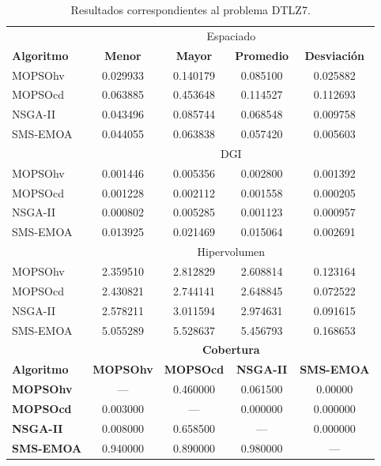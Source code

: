  \begin{table}
 \begin{center}
 \begin{tabular}{|l|cc|cc|} \hline
    & \multicolumn{4}{|c|}{Espaciado} \\ 
	\textbf{Algoritmo} & \textbf{Menor} & \textbf{Mayor} & \textbf{Promedio} & \textbf{Desviaci\'on} \\  \hline \hline
	MOPSOhv &0.029933 & 0.140179 & 0.085100 & 0.025882    \\ 
	MOPSOcd & 0.063885 & 0.453648 & 0.114527 & 0.112693   \\ 
	NSGA-II &0.043496 & 0.085744 & 0.068548 & 0.009758  \\  
	SMS-EMOA &0.044055 & 0.063838 & 0.057420 & 0.005603    \\  
	\hline
    & \multicolumn{4}{|c|}{DGI} \\ 
	\hline\hline
	MOPSOhv &0.001446 & 0.005356 & 0.002800 & 0.001392   \\ 
	MOPSOcd & 0.001228 & 0.002112 & 0.001558 & 0.000205   \\ 
	NSGA-II & 0.000802 & 0.005285 & 0.001123 & 0.000957  \\  
	SMS-EMOA &0.013925 & 0.021469 & 0.015064 & 0.002691  \\  
	\hline\hline
    & \multicolumn{4}{|c|}{Hipervolumen} \\ 
	\hline\hline
	MOPSOhv & 2.359510 & 2.812829 & 2.608814 & 0.123164  \\ 
	MOPSOcd & 2.430821 & 2.744141 & 2.648845 & 0.072522   \\ 
	NSGA-II & 2.578211 & 3.011594 & 2.974631 & 0.091615   \\  
	SMS-EMOA &5.055289 & 5.528637 & 5.456793 & 0.168653   \\  
	\hline\hline	
	& \multicolumn{4}{|c|}{\textbf{Cobertura}} \\ \hline\hline 
	\textbf{Algoritmo} & \textbf{MOPSOhv} & \textbf{MOPSOcd} & \textbf{NSGA-II} & \textbf{SMS-EMOA} \\  \hline \hline
	\textbf{MOPSOhv} &---       & 0.460000   & 0.061500 &  0.00000	 \\ 
	\textbf{MOPSOcd} & 0.003000 & ---       &  0.000000  & 0.000000 \\ 
	\textbf{NSGA-II} & 0.008000 & 0.658500  & ---      &  0.000000    \\  
	\textbf{SMS-EMOA}& 0.940000 & 0.890000  & 0.980000 & --- \\  
	\hline	
	\end{tabular}
\caption{Resultados correspondientes al problema DTLZ7.}
  \label{tab:dtlz7}
\end{center}
\end{table}


